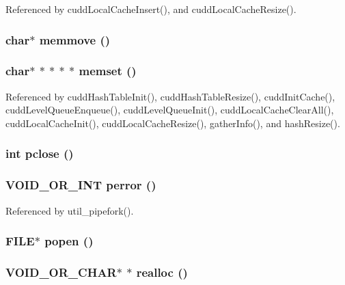 Referenced by cudd\-Local\-Cache\-Insert(), and cudd\-Local\-Cache\-Resize().
\subsubsection{\setlength{\rightskip}{0pt plus 5cm}char$\ast$ memmove ()}\label{util_8h_fb434ca60c6699bb20fd11a71be5b0e0}


\subsubsection{\setlength{\rightskip}{0pt plus 5cm}char$\ast$ $\ast$ $\ast$ $\ast$ $\ast$ memset ()}\label{util_8h_bb0ff13236cef90449bf0b3806c4f269}




Referenced by cudd\-Hash\-Table\-Init(), cudd\-Hash\-Table\-Resize(), cudd\-Init\-Cache(), cudd\-Level\-Queue\-Enqueue(), cudd\-Level\-Queue\-Init(), cudd\-Local\-Cache\-Clear\-All(), cudd\-Local\-Cache\-Init(), cudd\-Local\-Cache\-Resize(), gather\-Info(), and hash\-Resize().
\subsubsection{\setlength{\rightskip}{0pt plus 5cm}int pclose ()}\label{util_8h_01a6dd34fa639fc5ad5a05b22407a658}


\subsubsection{\setlength{\rightskip}{0pt plus 5cm}VOID\_\-OR\_\-INT perror ()}\label{util_8h_8cd793c79b4161ff5aa2403679616328}




Referenced by util\_\-pipefork().
\subsubsection{\setlength{\rightskip}{0pt plus 5cm}FILE$\ast$ popen ()}\label{util_8h_7a377e01cff8d8243569ddc8bfef959b}


\subsubsection{\setlength{\rightskip}{0pt plus 5cm}VOID\_\-OR\_\-CHAR$\ast$ $\ast$ realloc ()}\label{util_8h_52203fa1516a084bb346d8dc0a9455f0}




